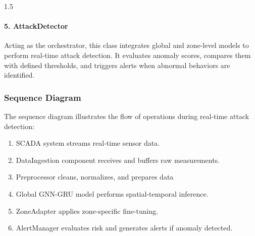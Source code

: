 \begin{spacing}{1.5}
\paragraph{5. AttackDetector}
Acting as the orchestrator, this class integrates global and zone-level models to perform real-time attack detection. It evaluates anomaly scores, compares them with defined thresholds, and triggers alerts when abnormal behaviors are identified.




\subsubsection{Sequence Diagram}

The sequence diagram illustrates the flow of operations during real-time attack detection:

\begin{enumerate}
    \item SCADA system streams real-time sensor data.
    \item DataIngestion component receives and buffers raw measurements.
    \item Preprocessor cleans, normalizes, and prepares data
    \item Global GNN-GRU model performs spatial-temporal inference.
    \item ZoneAdapter applies zone-specific fine-tuning.
    \item AlertManager evaluates risk and generates alerts if anomaly detected.
\end{enumerate}


\begin{figure}[H]
\centering
{}
\end{figure}
\end{spacing}
